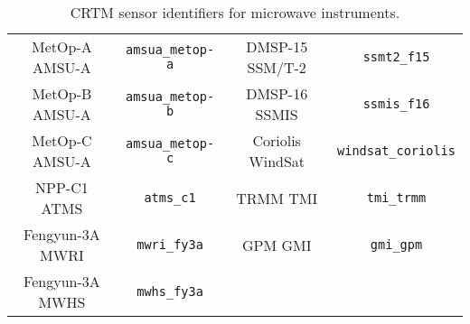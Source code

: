 \begin{table}[htp]
\begin{tabular}{|c|c||c|c|}
MetOp-A AMSU-A  & \texttt{amsua\_metop-a} & DMSP-15 SSM/T-2  & \texttt{ssmt2\_f15}         \\
MetOp-B AMSU-A  & \texttt{amsua\_metop-b} & DMSP-16 SSMIS    & \texttt{ssmis\_f16}         \\
MetOp-C AMSU-A  & \texttt{amsua\_metop-c} & Coriolis WindSat & \texttt{windsat\_coriolis}  \\
NPP-C1 ATMS     & \texttt{atms\_c1}       & TRMM TMI         & \texttt{tmi\_trmm}          \\
Fengyun-3A MWRI & \texttt{mwri\_fy3a}     & GPM GMI          & \texttt{gmi\_gpm}           \\
Fengyun-3A MWHS & \texttt{mwhs\_fy3a}     &                  &                             \\
    \hline
  \end{tabular}
  \caption{CRTM sensor identifiers for microwave instruments.}
  \label{tab:mw_sensor_id}
\end{table}


